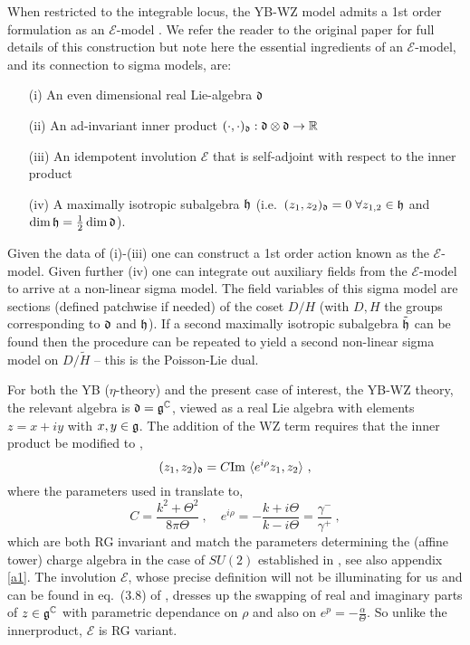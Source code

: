 \documentclass[12pt]{article}
\def\ee{\boldsymbol{e}}
\def\be{\begin{equation}}
\def\ee{\end{equation}}
\begin{document}
When restricted to the integrable locus, the YB-WZ model admits a 1st order formulation as an ${\mathcal E}$-model \cite{Klimcik:2017ken}.  We refer the reader to the original paper for full details of this construction but note here the essential ingredients of an  ${\mathcal E}$-model, and its connection to sigma models, are:
\begin{enumerate}
\item[(i)] An even dimensional real Lie-algebra $\frak{d}$ 
\item[(ii)] An ad-invariant inner product  $( \cdot , \cdot )_\frak{d}: \frak{d}\otimes \frak{d} \to \mathbb{R}$
\item[(iii)] An idempotent involution ${\mathcal E}$ that is self-adjoint with respect to the inner product
\item[(iv)] A maximally isotropic subalgebra $\frak{h}$ (i.e.\ $(z_1, z_2)_\frak{d} = 0\;  \forall z_{1,2} \in \frak{h}$ and $ \dim \frak{h} = \frac{1}{2} \dim \frak{d} $).  
\end{enumerate}
Given the data of (i)-(iii) one can construct a 1st order action known as the ${\mathcal E}$-model. Given further (iv)   one can integrate out auxiliary fields from the  ${\mathcal E}$-model to arrive at a non-linear sigma model.  The field variables of this sigma model are sections (defined patchwise if needed) of the coset $D/H$ (with $ D,H$ the groups corresponding to $\frak{d}$ and $\frak{h}$).   If a second maximally isotropic subalgebra $\tilde{\frak{h}}$ can be found then the procedure can be repeated to yield a second non-linear sigma model on $D/\tilde{H}$ -- this is the Poisson-Lie dual.

For both the YB ($\eta$-theory) and the present case of interest, the YB-WZ theory,  the relevant algebra is $ \frak{d}= \frak{g}^\mathbb{C}$, viewed as a real Lie algebra with elements $z= x+ i y $ with $x,y \in \frak{g}$.  The addition of the WZ term requires that the inner product be modified to 
\cite{Klimcik:2017ken},
\be\label{eq:inner}
(z_1, z_2)_\frak{d} = C   \textrm{Im}~\langle e^{i\rho} z_1 , z_2 \rangle \ , 
 \ee
where the parameters used in \cite{Klimcik:2017ken} translate to, 
\be\label{eq:prmap}
C = \frac{k^2 + \Theta^2}{8\pi \Theta} \ , \quad  e^{i\rho}= -\frac{k+ i\Theta }{k- i\Theta}  = \frac{\gamma^{-}}{\gamma^{+} }  \ , 
\ee
  which are both RG invariant and match the parameters determining the (affine tower) charge algebra in the case of $SU(2)$ established in \cite{Kawaguchi:2013gma}, see also appendix \ref{a1}.   The involution $\mathcal{E}$, whose precise definition will not be illuminating for us and can be found in  eq.~(3.8) of \cite{Klimcik:2017ken},  dresses up the  swapping  of real and imaginary parts of $z\in \frak{g}^\mathbb{C}$ with parametric dependance on $\rho$ and also on $e^p = -\frac{\alpha}{\Theta}$.  So unlike the innerproduct, $\mathcal{E}$ is  RG variant.   
  
\end{document}

